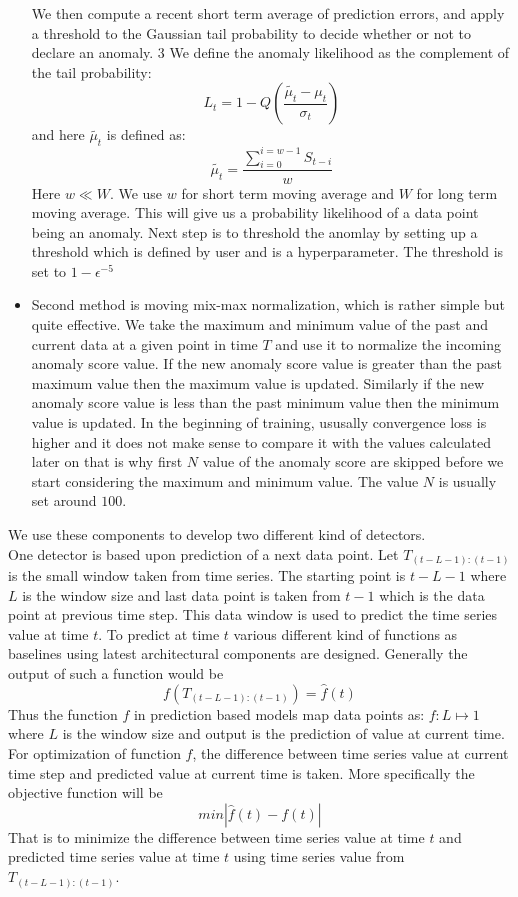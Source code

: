 \documentclass[12pt]{article}
\begin{document}
\begin{itemize}
We then compute a recent short term average of prediction
errors, and apply a threshold to the Gaussian tail probability
to decide whether or not to declare an anomaly. 3
We define the anomaly likelihood as the complement of the tail
probability:
\begin{equation}
L_t = 1-Q (\frac{\tilde{\mu_t}-\mu_t}{\sigma_t})
\end{equation}
and here $\tilde{\mu_t}$ is defined as:
\begin{equation}
\tilde{\mu_t} = \frac{\sum_{i=0}^{i=w-1}S_{t-i}}{w}
\end{equation}
Here $w \ll W$. We use $w$ for short term moving average and $W$ for long term moving average. This will give us a probability likelihood of a data point being an anomaly. Next step is to threshold the anomlay by setting up a threshold which is defined by user and is a hyperparameter. The threshold is set to $1-\epsilon^{-5	}$
\item Second method is moving mix-max normalization, which is rather simple but quite effective. We take the maximum and minimum value of the past and current data at a given point in time $T$ and use it to normalize the incoming anomaly score value. If the new anomaly score value is greater than the past maximum value then the maximum value is updated. Similarly if the new anomaly score value is less than the past minimum value then the minimum value is updated. In the beginning of training, ususally convergence loss is higher and it does not make sense to compare it with the values calculated later on that is why first $N$ value of the anomaly score are skipped before we start considering the maximum and minimum value. The value $N$ is usually set around $100$.
\end{itemize}
We use these components to develop two different kind of detectors.\\
\break
One detector is based upon prediction of a next data point. Let $T_{(t-L-1):(t-1)}$ is the small window taken from time series. The starting point is $t-L-1$ where $L$ is the window size and last data point is taken from $t-1$ which is the data point at previous time step. This data window is used to predict the time series value at time $t$. To predict at time $t$ various different kind of functions as baselines using latest architectural components are designed. Generally the output of such a function would be
\begin{equation}
f(T_{(t-L-1):(t-1)}) = \hat{f}(t)
\end{equation} 
Thus the function $f$ in prediction based models map data points as: $f: L \mapsto 1$ where $L$ is the window size and output is the prediction of value at current time. For optimization of function $f$, the difference between time series value at current time step and predicted value at current time is taken. More specifically the objective function will be
\begin{equation}
min |\hat{f}(t) - f(t)|
\end{equation}
That is to minimize the difference between time series value at time $t$ and predicted time series value at time $t$ using time series value from $T_{(t-L-1):(t-1)}$.
\end{document}
